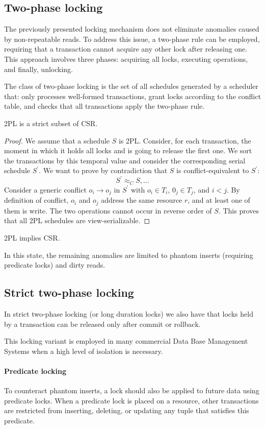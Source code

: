 \subsection{Two-phase locking}
The previously presented locking mechanism does not eliminate anomalies caused by non-repeatable reads. 
To address this issue, a two-phase rule can be employed, requiring that a transaction cannot acquire any other lock after releasing one. 
This approach involves three phases: acquiring all locks, executing operations, and finally, unlocking.
\begin{definition}
    The class of two-phase locking is the set of all schedules generated by a scheduler that: only processes well-formed transactions, grant locks according to the conflict table, and checks that all transactions apply the two-phase rule.             
\end{definition}
\begin{property}
    2PL is a strict subset of CSR. 
\end{property}
\begin{proof}
    We assume that a schedule $S$ is 2PL. Consider, for each transaction, the moment in which it holds all locks and is going to release the first one. 
    We sort the transactions by this temporal value and consider the corresponding serial schedule $S^{'}$. 
    We want to prove by contradiction that $S$ is conflict-equivalent to $S^{'}$: 
    \[S^{'}\approx_CS,\dots\]
    Consider a generic conflict $o_i \rightarrow o_j$ in $S^{'}$ with $o_i \in T_i$, $0_j \in T_j$, and $i<j$. 
    By definition of conflict, $o_i$ and $o_j$ address the same resource $r$, and at least one of them is write. 
    The two operations cannot occur in reverse order of $S$. 
    This proves that all 2PL schedules are view-serializable. 
\end{proof}
\begin{property}
    2PL implies CSR.
\end{property}
In this state, the remaining anomalies are limited to phantom inserts (requiring predicate locks) and dirty reads.

\subsection{Strict two-phase locking}
\begin{definition}
    In strict two-phase locking (or long duration locks) we also have that locks held by a transaction can be released only after commit or rollback.
\end{definition}
This locking variant is employed in many commercial Data Base Management Systems when a high level of isolation is necessary.

\paragraph*{Predicate locking}
To counteract phantom inserts, a lock should also be applied to future data using predicate locks. 
When a predicate lock is placed on a resource, other transactions are restricted from inserting, deleting, or updating any tuple that satisfies this predicate.